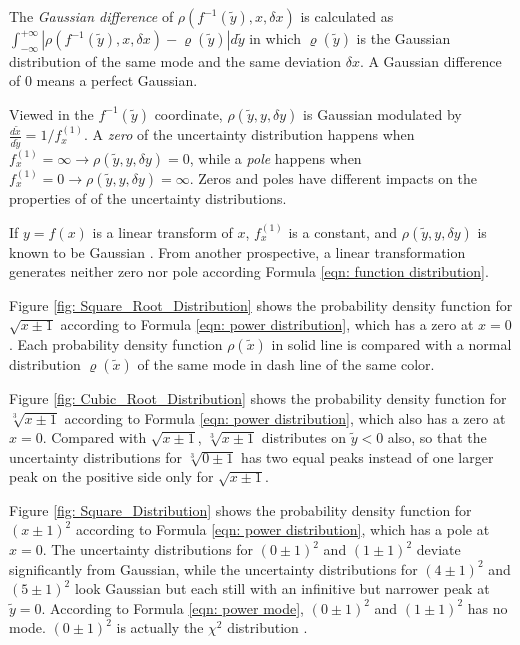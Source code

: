 \documentclass[twoside]{article}
\numberwithin{equation}{section}
\begin{document}
The \emph{Gaussian difference} of $\rho(f^{-1}(\tilde{y}), x, \delta x)$ is calculated as $\int_{-\infty}^{+\infty} |\rho(f^{-1}(\tilde{y}), x, \delta x) - \varrho(\tilde{y})| d \tilde{y}$ in which $\varrho(\tilde{y})$ is the Gaussian distribution of the same mode and the same deviation $\delta x$.
A Gaussian difference of 0 means a perfect Gaussian.

Viewed in the $f^{-1}(\tilde{y})$ coordinate, $\rho(\tilde{y}, y, \delta y)$ is Gaussian modulated by $\frac{d\tilde{x}}{d\tilde{y}} = 1/f^{(1)}_x$.
A \emph{zero} of the uncertainty distribution happens when $f^{(1)}_x=\infty \rightarrow \rho(\tilde{y}, y, \delta y) = 0$, while a \emph{pole} happens when $f^{(1)}_x=0 \rightarrow \rho(\tilde{y}, y, \delta y) = \infty$.
Zeros and poles have different impacts on the properties of of the uncertainty distributions.

If $y=f(x)$ is a linear transform of $x$, $f^{(1)}_x$ is a constant, and $\rho(\tilde{y}, y, \delta y)$ is known to be Gaussian \cite{Probability_Statistics}.
From another prospective, a linear transformation generates neither zero nor pole according Formula \eqref{eqn: function distribution}.

Figure \ref{fig: Square_Root_Distribution} shows the probability density function for $\sqrt{x \pm 1}$ according to Formula \eqref{eqn: power distribution}, which has a zero at $x=0$.
Each probability density function $\rho(\tilde{x})$ in solid line is compared with a normal distribution $\varrho(\tilde{x})$ of the same mode in dash line of the same color.

Figure \ref{fig: Cubic_Root_Distribution} shows the probability density function for $\sqrt[3]{x \pm 1}$ according to Formula \eqref{eqn: power distribution}, which also has a zero at $x=0$.
Compared with $\sqrt{x \pm 1}$, $\sqrt[3]{x \pm 1}$ distributes on $\tilde{y} < 0$ also, so that the uncertainty distributions for $\sqrt[3]{0 \pm 1}$ has two equal peaks instead of one larger peak on the positive side only for $\sqrt{x \pm 1}$.

Figure \ref{fig: Square_Distribution} shows the probability density function for $(x \pm 1)^2$ according to Formula \eqref{eqn: power distribution}, which has a pole at $x=0$.
The uncertainty distributions for $(0 \pm 1)^2$ and $(1 \pm 1)^2$ deviate significantly from Gaussian, while the uncertainty distributions for $(4 \pm 1)^2$ and $(5 \pm 1)^2$ look Gaussian but each still with an infinitive but narrower peak at $\tilde{y} = 0$.
According to Formula \eqref{eqn: power mode}, $(0 \pm 1)^2$ and $(1 \pm 1)^2$ has no mode.
$(0 \pm 1)^2$ is actually the $\chi^2$ distribution \cite{Statistical_Methods}.
\end{document}
